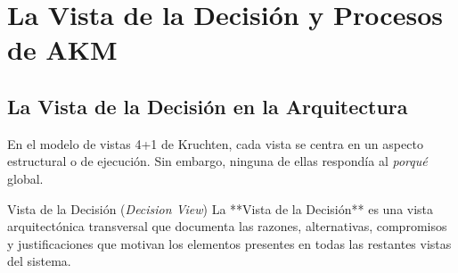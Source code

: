 \section{La Vista de la Decisión y Procesos de AKM}
\label{sec:vista-decision-procesos}

\subsection{La Vista de la Decisión en la Arquitectura}

En el modelo de vistas 4+1 de Kruchten, cada vista se centra en un aspecto estructural o de ejecución. Sin embargo, ninguna de ellas respondía al \emph{porqué} global.

\begin{definicion}{Vista de la Decisión (\emph{Decision View})}
La **Vista de la Decisión** es una vista arquitectónica transversal que documenta las razones, alternativas, compromisos y justificaciones que motivan los elementos presentes en todas las restantes vistas del sistema.
\end{definicion}

